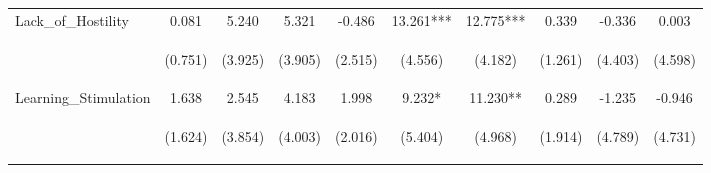 \begin{tabular}{lccccccccc}
\noalign{\smallskip}Lack_of_Hostility & 0.081 & 5.240 & 5.321 & -0.486 & 13.261*** & 12.775*** & 0.339 & -0.336 & 0.003\\
 & \begin{footnotesize}(0.751)\end{footnotesize} & \begin{footnotesize}(3.925)\end{footnotesize} & \begin{footnotesize}(3.905)\end{footnotesize} & \begin{footnotesize}(2.515)\end{footnotesize} & \begin{footnotesize}(4.556)\end{footnotesize} & \begin{footnotesize}(4.182)\end{footnotesize} & \begin{footnotesize}(1.261)\end{footnotesize} & \begin{footnotesize}(4.403)\end{footnotesize} & \begin{footnotesize}(4.598)\end{footnotesize}\\
\noalign{\smallskip}Learning_Stimulation & 1.638 & 2.545 & 4.183 & 1.998 & 9.232* & 11.230** & 0.289 & -1.235 & -0.946\\
 & \begin{footnotesize}(1.624)\end{footnotesize} & \begin{footnotesize}(3.854)\end{footnotesize} & \begin{footnotesize}(4.003)\end{footnotesize} & \begin{footnotesize}(2.016)\end{footnotesize} & \begin{footnotesize}(5.404)\end{footnotesize} & \begin{footnotesize}(4.968)\end{footnotesize} & \begin{footnotesize}(1.914)\end{footnotesize} & \begin{footnotesize}(4.789)\end{footnotesize} & \begin{footnotesize}(4.731)\end{footnotesize}\\

\end{tabular}
